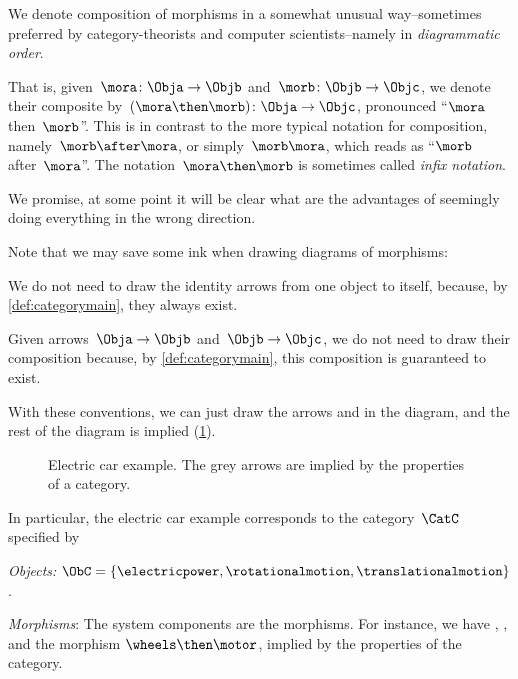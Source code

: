 
\begin{remark}
We denote composition of morphisms in a somewhat unusual way--sometimes preferred by category-theorists and computer scientists--namely in \emph{diagrammatic order}.

That is, given~$\mora \colon \Obja\to \Objb$ and~$\morb \colon \Objb \to \Objc$, we denote their composite by~$(\mora\then \morb)\colon \Obja\to \Objc$, pronounced ``$\mora$ then~$\morb$''. This is in contrast to the more typical notation for composition, namely~$\morb\after \mora$, or simply~$\morb \mora$, which reads as ``$\morb$ after~$\mora$''. The notation~$\mora \then \morb$ is sometimes called \emph{infix notation}.

We promise, at some point it will be clear what are the advantages of seemingly doing everything 
in the wrong direction.
\end{remark}

Note that we may save some ink when drawing diagrams of morphisms:
\begin{compactitem}
\item We do not need to draw the identity arrows from one object to itself, because, by \cref{def:categorymain}, they always exist.
\item  Given arrows~$\Obja \to \Objb$ and~$\Objb \to \Objc$, we do not need to draw their composition because, by \cref{def:categorymain}, this composition is guaranteed to exist.
\end{compactitem}

With these conventions, we can just draw the arrows \motor and \wheels in the diagram, and the rest of the diagram is implied (\cref{fig:e5}).

\begin{figure}[h!]
    \centering
    \caption{Electric car example. The grey arrows are implied by the properties
    of a category.\label{fig:e5}}
\end{figure}

In particular, the electric car example corresponds to the category~$\CatC$ specified by
\begin{compactitem}
    \item \emph{Objects:} $\ObC=\{\electricpower,\rotationalmotion,\translationalmotion\}$.
    \item \emph{Morphisms}: The system components are the morphisms. For instance, we have \motor, \wheels, and the morphism $\wheels \then \motor$, implied by the properties of the category.
\end{compactitem}

